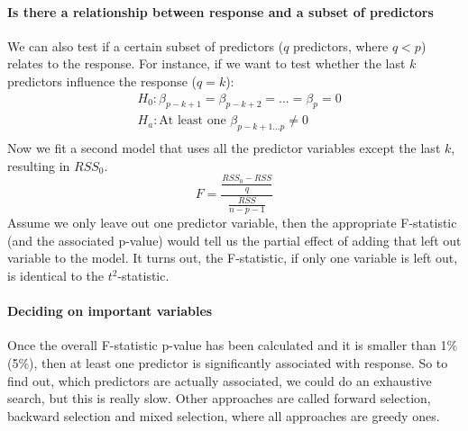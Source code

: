 \documentclass[../document.tex]{subfiles}
\begin{document}
	\paragraph{Is there a relationship between response and a subset of predictors}
	We can also test if a certain subset of predictors ($q$ predictors, where $q < p$) relates to the response. For instance, if we want to test whether the last $k$ predictors influence the response ($q=k$):
	\begin{equation}
	\begin{split}
		&H_{0}: \beta_{p-k+1}=\beta_{p-k+2}=...=\beta_{p}=0 \\
		&H_{a}: \text{At least one } \beta_{p-k+1 \dots p}\ne 0 \\
	\end{split}
	\end{equation}
	Now we fit a second model that uses all the predictor variables except the last $k$, resulting in \(RSS_{0}\).
	\begin{equation}
		F = \frac{\frac{RSS_{0}-RSS}{q}}{\frac{RSS}{n-p-1}}
	\end{equation}
	Assume we only leave out one predictor variable, then the appropriate F-statistic (and the associated p-value) would tell us the partial effect of adding that left out variable to the model. It turns out, the F-statistic, if only one variable is left out, is identical to the $t^2$-statistic.

	\paragraph{Deciding on important variables}
	Once the overall F-statistic p-value has been calculated and it is smaller than 1\% (5\%), then at least one predictor is significantly associated with response. So to find out, which predictors are actually associated, we could do an exhaustive search, but this is really slow. Other approaches are called forward selection, backward selection and mixed selection, where all approaches are greedy ones.
\end{document}
